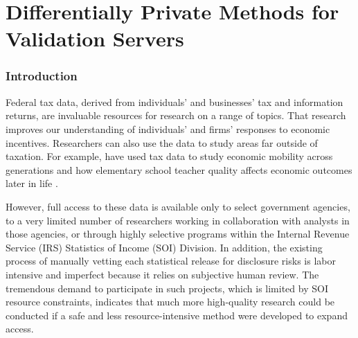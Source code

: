 
\fancyfoot{}



\part{Differentially Private Methods for Validation Servers}

\section{Introduction}\label{sec:intro}

Federal tax data, derived from individuals' and businesses' tax and information returns, are invaluable resources for research on a range of topics. That research improves our understanding of individuals' and firms' responses to economic incentives. Researchers can also use the data to study areas far outside of taxation. For example, \citet{chetty2014measuring} have used tax data to study economic mobility across generations and how elementary school teacher quality affects economic outcomes later in life \citep{chetty2011does}.

However, full access to these data is available only to select government agencies, to a very limited number of researchers working in collaboration with analysts in those agencies, or through highly selective programs within the Internal Revenue Service (IRS) Statistics of Income (SOI) Division. In addition, the existing process of manually vetting each statistical release for disclosure risks is labor intensive and imperfect because it relies on subjective human review. The tremendous demand to participate in such projects, which is limited by SOI resource constraints, indicates that much more high-quality research could be conducted if a safe and less resource-intensive method were developed to expand access.

